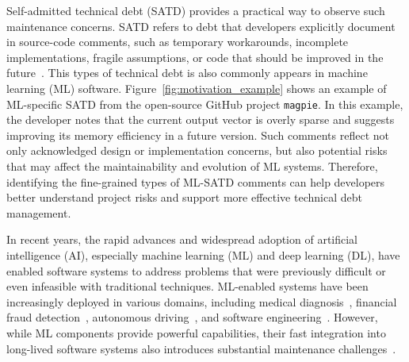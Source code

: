 \documentclass[acmsmall,screen,review,anonymous]{acmart}
\begin{document}
Self-admitted technical debt (SATD) provides a practical way to observe such maintenance concerns. SATD refers to debt that developers explicitly document in source-code comments, such as temporary workarounds, incomplete implementations, fragile assumptions, or code that should be improved in the future~\cite{}. This types of technical debt is also commonly appears in machine learning (ML) software. Figure~\ref{fig:motivation_example} shows an example of ML-specific SATD from the open-source GitHub project \texttt{magpie}. In this example, the developer notes that the current output vector is overly sparse and suggests improving its memory efficiency in a future version. Such comments reflect not only acknowledged design or implementation concerns, but also potential risks that may affect the maintainability and evolution of ML systems. Therefore, identifying the fine-grained types of ML-SATD comments can help developers better understand project risks and support more effective technical debt management.










In recent years, the rapid advances and widespread adoption of artificial intelligence (AI), especially machine learning (ML) and deep learning (DL), have enabled software systems to address problems that were previously difficult or even infeasible with traditional techniques. ML-enabled systems have been increasingly deployed in various domains, including medical diagnosis~\cite{}, financial fraud detection~\cite{}, autonomous driving~\cite{}, and software engineering~\cite{amershi2019software}. However, while ML components provide powerful capabilities, their fast integration into long-lived software systems also introduces substantial maintenance challenges~\cite{sklavenitis2024measuring}. 
\end{document}
